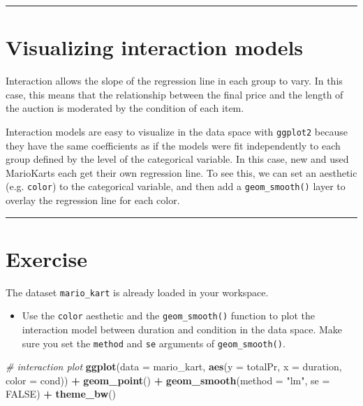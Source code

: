 \documentclass[]{book}
\newenvironment{Shaded}{\begin{snugshade}}{\end{snugshade}}
\newcommand{\KeywordTok}[1]{\textcolor[rgb]{0.13,0.29,0.53}{\textbf{#1}}}
\newcommand{\DataTypeTok}[1]{\textcolor[rgb]{0.13,0.29,0.53}{#1}}
\newcommand{\StringTok}[1]{\textcolor[rgb]{0.31,0.60,0.02}{#1}}
\newcommand{\CommentTok}[1]{\textcolor[rgb]{0.56,0.35,0.01}{\textit{#1}}}
\newcommand{\OtherTok}[1]{\textcolor[rgb]{0.56,0.35,0.01}{#1}}
\newcommand{\OperatorTok}[1]{\textcolor[rgb]{0.81,0.36,0.00}{\textbf{#1}}}
\newcommand{\NormalTok}[1]{#1}
\providecommand{\tightlist}{%
  \setlength{\itemsep}{0pt}\setlength{\parskip}{0pt}}
\begin{document}
\begin{center}\rule{0.5\linewidth}{\linethickness}\end{center}

\section{Visualizing interaction
models}\label{visualizing-interaction-models}

Interaction allows the slope of the regression line in each group to
vary. In this case, this means that the relationship between the final
price and the length of the auction is moderated by the condition of
each item.

Interaction models are easy to visualize in the data space with
\texttt{ggplot2} because they have the same coefficients as if the
models were fit independently to each group defined by the level of the
categorical variable. In this case, new and used MarioKarts each get
their own regression line. To see this, we can set an aesthetic (e.g.
\texttt{color}) to the categorical variable, and then add a
\texttt{geom\_smooth()} layer to overlay the regression line for each
color.

\begin{center}\rule{0.5\linewidth}{\linethickness}\end{center}

\section*{Exercise}\label{exercise-7}

The dataset \texttt{mario\_kart} is already loaded in your workspace.

\begin{itemize}
\tightlist
\item
  Use the \texttt{color} aesthetic and the \texttt{geom\_smooth()}
  function to plot the interaction model between duration and condition
  in the data space. Make sure you set the \texttt{method} and
  \texttt{se} arguments of \texttt{geom\_smooth()}.
\end{itemize}

\begin{Shaded}
\begin{Highlighting}[]
\CommentTok{# interaction plot}
\KeywordTok{ggplot}\NormalTok{(}\DataTypeTok{data =}\NormalTok{ mario_kart, }\KeywordTok{aes}\NormalTok{(}\DataTypeTok{y =}\NormalTok{ totalPr, }\DataTypeTok{x =}\NormalTok{ duration, }\DataTypeTok{color =}\NormalTok{ cond)) }\OperatorTok{+}
\StringTok{  }\KeywordTok{geom_point}\NormalTok{() }\OperatorTok{+}\StringTok{ }
\StringTok{  }\KeywordTok{geom_smooth}\NormalTok{(}\DataTypeTok{method =} \StringTok{"lm"}\NormalTok{, }\DataTypeTok{se =} \OtherTok{FALSE}\NormalTok{) }\OperatorTok{+}
\StringTok{  }\KeywordTok{theme_bw}\NormalTok{()}
\end{Highlighting}
\end{Shaded}
\end{document}

